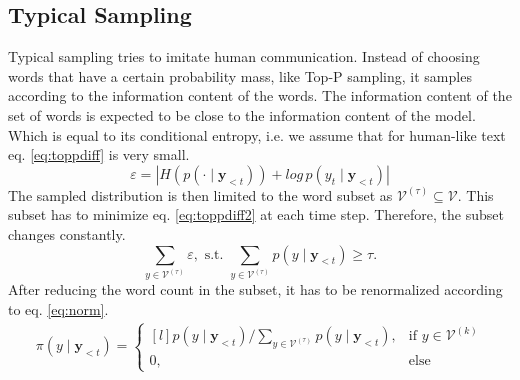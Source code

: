 \subsection{Typical Sampling}
Typical sampling \cite{meister2022typical} tries to imitate human communication. Instead of choosing words that have a certain probability mass, like Top-P sampling, it samples according to the information content of the words. The information content of the set of words is expected to be close to the information content of the model. Which is equal to its conditional entropy, i.e. we assume that for human-like text eq. \ref{eq:toppdiff} is very small.
\begin{equation}
    \varepsilon=\left|H(p(\cdot\mid \mathbf{y}_{<t}))+log\, p(y_t\mid \mathbf{y}_{<t})\right|
\label{eq:toppdiff}
\end{equation}
The sampled distribution is then limited to the word subset as $\mathcal{V}^{(\tau)}\subseteq\mathcal{V}$. This subset has to minimize eq. \ref{eq:toppdiff2} at each time step. Therefore, the subset changes constantly. 
\begin{equation}
    \sum_{y\in\mathcal{V}^{(\tau)}}{\varepsilon},\text{ s.t. }\sum_{y\in\mathcal{V}^{(\tau)}}{p(y\mid \mathbf{y}_{<t})}\geq\tau.
\label{eq:toppdiff2}
\end{equation}
After reducing the word count in the subset, it has to be renormalized according to eq. \ref{eq:norm}.
\begin{equation}
    \begin{aligned}
        \pi(y\mid\mathbf{y}_{<t})=\left\{
        \begin{matrix*}[l]
            p(y\mid\mathbf{y}_{<t})/\sum_{y\in\mathcal{V}^{(\tau)}}{p(y\mid\mathbf{y}_{<t})}, & \text{if }y\in \mathcal{V}^{(k)} \\ 
            0, & \text{else}
        \end{matrix*}\right.
    \end{aligned}
\label{eq:norm}
\end{equation}

